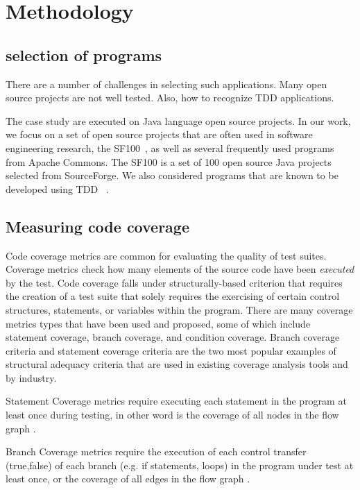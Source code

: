 \documentclass[conference]{IEEEtran}
\begin{document}
\section{Methodology}\label{sec:Methodology}

\subsection{selection of programs}
	There are a number of challenges in selecting such applications.  Many open source projects are not well tested. Also, how to recognize TDD applications.
    
    The case study are executed on Java language open source projects. In our work, we focus on a set of open source projects that are often used in software engineering research, the SF100~\cite{bench_sf100}, as well as several frequently used programs from Apache Commons. The SF100 is a set of 100 open source Java projects selected from SourceForge. We also considered programs that are known to be developed using TDD ~\cite{mlevinson:2008}. 

\subsection{Measuring code coverage}
Code coverage metrics are common for evaluating the quality of test suites. Coverage metrics check how many elements of the source code  have been \textit{executed} by the test. Code coverage falls under structurally-based criterion that requires the creation of a test suite that solely requires the exercising of certain control structures, statements, or variables within the program\cite{kapfhammer-testing-handbook}. There are many coverage metrics types that have been used and proposed, some of which include statement coverage, branch coverage, and condition coverage. Branch coverage criteria and statement coverage criteria are the two most popular examples of structural adequacy criteria that are used in existing coverage analysis tools and by industry\cite{weyuker1988evaluation}.

Statement Coverage metrics require executing each statement in the program at least once during testing, in other word is the coverage of all nodes in the flow graph \cite{zhu1997software}.

Branch Coverage metrics require the execution of each control transfer (true,false) of each branch (e.g. if statements, loops)  in the program under test at least once, or the coverage of all edges in the flow graph \cite{zhu1997software}.\\
\end{document}
